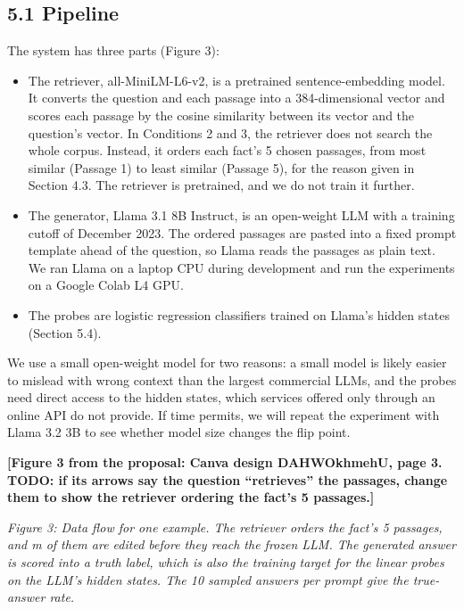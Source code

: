 \documentclass[
  12pt,
  letterpaper,
]{article}
\providecommand{\tightlist}{%
  \setlength{\itemsep}{0pt}\setlength{\parskip}{0pt}}
\begin{document}
\subsection{5.1 Pipeline}\label{pipeline}

The system has three parts (Figure 3):

\begin{itemize}
\tightlist
\item
  The retriever, all-MiniLM-L6-v2, is a pretrained
  sentence-embedding model. It converts the
  question and each passage into a 384-dimensional
  vector and scores each passage by the cosine
  similarity between its vector and the question's
  vector. In Conditions 2 and 3, the retriever
  does not search the whole corpus. Instead, it
  orders each fact's 5 chosen passages, from most
  similar (Passage 1) to least similar (Passage
  5), for the reason given in Section 4.3. The
  retriever is pretrained, and we do not train it
  further.
\item
  The generator, Llama 3.1 8B Instruct, is an
  open-weight LLM with a training cutoff of
  December 2023. The ordered passages are pasted
  into a fixed prompt template ahead of the
  question, so Llama reads the passages as plain
  text. We ran Llama on a laptop CPU during
  development and run the experiments on a Google
  Colab L4 GPU.
\item
  The probes are logistic regression classifiers
  trained on Llama's hidden states (Section 5.4).
\end{itemize}

We use a small open-weight model for two reasons:
a small model is likely easier to mislead with
wrong context than the largest commercial LLMs,
and the probes need direct access to the hidden
states, which services offered only through an
online API do not provide. If time permits, we
will repeat the experiment with Llama 3.2 3B to
see whether model size changes the flip point.

\textbf{{[}Figure 3 from the proposal: Canva
design DAHWOkhmehU, page 3. TODO: if its arrows
say the question ``retrieves'' the passages,
change them to show the retriever ordering the
fact's 5 passages.{]}}

\emph{Figure 3: Data flow for one example. The
retriever orders the fact's 5 passages, and m of
them are edited before they reach the frozen LLM.
The generated answer is scored into a truth label,
which is also the training target for the linear
probes on the LLM's hidden states. The 10 sampled
answers per prompt give the true-answer rate.}
\end{document}
